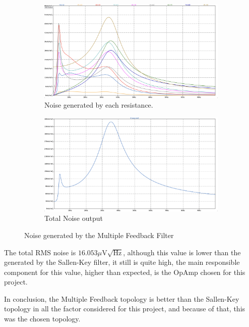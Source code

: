 \begin{figure}[H]
    \centering
    \begin{subfigure}{0.45\textwidth}
        \includegraphics*[width=\textwidth]{Images/NoiseResMFB.png}
        \caption{Noise generated by each resistance.}
        \label{fig:NoiseResMFB}  
    \end{subfigure}
    \begin{subfigure}{0.45\textwidth}
        \includegraphics*[width=\textwidth]{Images/NoiseTotalMFB.png}
        \caption{Total Noise output}
        \label{fig:NoiseTotalMFB}    
    \end{subfigure}
    \caption{Noise generated by the Multiple Feedback Filter}
    \label{fig:NoiseMFB}
\end{figure}

The total RMS noise is $16.053\mu \si{\volt}\sqrt{\si{\hertz}}$, although this value is lower than the generated by the Sallen-Key filter, it still is quite high, the main responsible component for this value, higher than expected, is the OpAmp chosen for this project.

In conclusion, the Multiple Feedback topology is better than the Sallen-Key topology in all the factor considered for this project, and because of that, this was the chosen topology.

